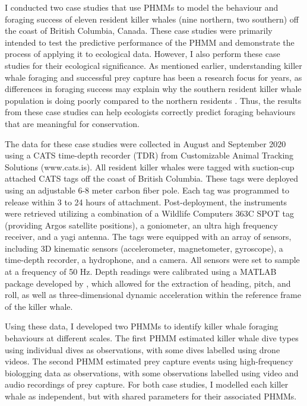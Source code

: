 I conducted two case studies that use PHMMs to model the behaviour and foraging success of eleven resident killer whales (nine northern, two southern) off the coast of British Columbia, Canada. These case studies were primarily intended to test the predictive performance of the PHMM and demonstrate the process of applying it to ecological data. However, I also perform these case studies for their ecological significance. As mentioned earlier, understanding killer whale foraging and successful prey capture has been a research focus for years, as differences in foraging success may explain why the southern resident killer whale population is doing poorly compared to the northern residents \citep{Noren:2011, Tennessen:2023}. Thus, the results from these case studies can help ecologists correctly predict foraging behaviours that are meaningful for conservation. 


The data for these case studies were collected in August and September 2020 using a CATS time-depth recorder (TDR) from Customizable Animal Tracking Solutions (www.cats.is). All resident killer whales were tagged with suction-cup attached CATS tags off the coast of British Columbia. These tags were deployed using an adjustable 6-8 meter carbon fiber pole. Each tag was programmed to release within 3 to 24 hours of attachment. Post-deployment, the instruments were retrieved utilizing a combination of a Wildlife Computers 363C SPOT tag (providing Argos satellite positions), a goniometer, an ultra high frequency receiver, and a yagi antenna. The tags were equipped with an array of sensors, including 3D kinematic sensors (accelerometer, magnetometer, gyroscope), a time-depth recorder, a hydrophone, and a camera. All sensors were set to sample at a frequency of 50 Hz. Depth readings were calibrated using a MATLAB package developed by \citet{Cade:2021}, which allowed for the extraction of heading, pitch, and roll, as well as three-dimensional dynamic acceleration within the reference frame of the killer whale.

Using these data, I developed two PHMMs to identify killer whale foraging behaviours at different scales. The first PHMM estimated killer whale dive types using individual dives as observations, with some dives labelled using drone videos. The second PHMM estimated prey capture events using high-frequency biologging data as observations, with some observations labelled using video and audio recordings of prey capture. For both case studies, I modelled each killer whale as independent, but with shared parameters for their associated PHMMs. 

